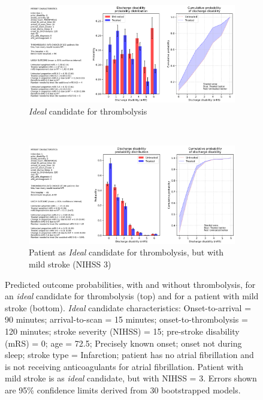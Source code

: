 \begin{figure}[h]
    \centering
    \begin{subfigure}[b]{1.0\textwidth}
        \centering
    \includegraphics[width=1.0\linewidth]{images/prototype_patient_ideal}
        \caption{\textit{Ideal} candidate for thrombolysis}
        \label{fig:patient_outcome_subfig1}
    \end{subfigure}
    \\
    \vspace{8mm}
    \begin{subfigure}[b]{1.0\textwidth}
        \centering
        \includegraphics[width=1.0\linewidth]{images/prototype_patient_mild}
        \caption{Patient as \textit{Ideal} candidate for thrombolysis, but with mild stroke (NIHSS 3)}
        \label{fig:patient_outcome_subfig2}
    \end{subfigure}
    \caption{Predicted outcome probabilities, with and without thrombolysis, for an \textit{ideal} candidate for thrombolysis (top) and for a patient with mild stroke (bottom). \textit{Ideal} candidate characteristics: Onset-to-arrival = 90 minutes; arrival-to-scan = 15 minutes; onset-to-thrombolysis = 120 minutes; stroke severity (NIHSS) = 15; pre-stroke disability (mRS) = 0; age = 72.5; Precisely known onset; onset not during sleep; stroke type = Infarction; patient has no atrial fibrillation and is not receiving anticoagulants for atrial fibrillation. Patient with mild stroke is as \textit{ideal} candidate, but with NIHSS = 3. Errors shown are 95\% confidence limits derived from 30 bootstrapped models.}
    \label{fig:example_patient_outcomes}
\end{figure}




